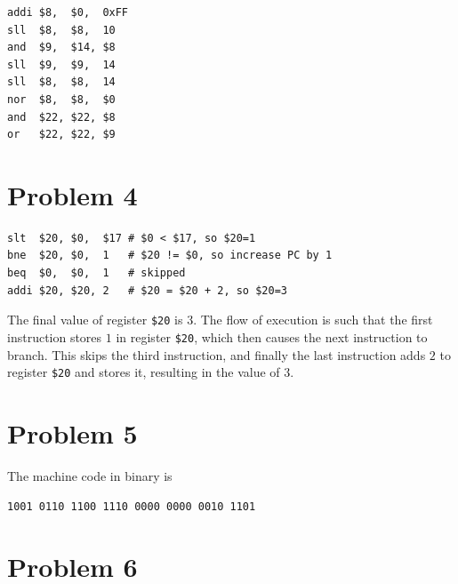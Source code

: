 \documentclass[12pt]{article}
\begin{document}
\begin{verbatim}
addi $8,  $0,  0xFF
sll  $8,  $8,  10
and  $9,  $14, $8
sll  $9,  $9,  14
sll  $8,  $8,  14
nor  $8,  $8,  $0
and  $22, $22, $8
or   $22, $22, $9
\end{verbatim}

\section*{Problem 4}

\begin{verbatim}
slt  $20, $0,  $17 # $0 < $17, so $20=1
bne  $20, $0,  1   # $20 != $0, so increase PC by 1
beq  $0,  $0,  1   # skipped
addi $20, $20, 2   # $20 = $20 + 2, so $20=3
\end{verbatim}
The final value of register \texttt{\$20} is \(3\). The flow of execution is such that the first instruction stores \(1\) in register
\texttt{\$20}, which then causes the next instruction to branch. This skips the third instruction, and finally the last instruction adds
\(2\) to register \texttt{\$20} and stores it, resulting in the value of \(3\).

\section*{Problem 5}

The machine code in binary is
\begin{verbatim}
1001 0110 1100 1110 0000 0000 0010 1101
\end{verbatim}

\section*{Problem 6}
\end{document}
